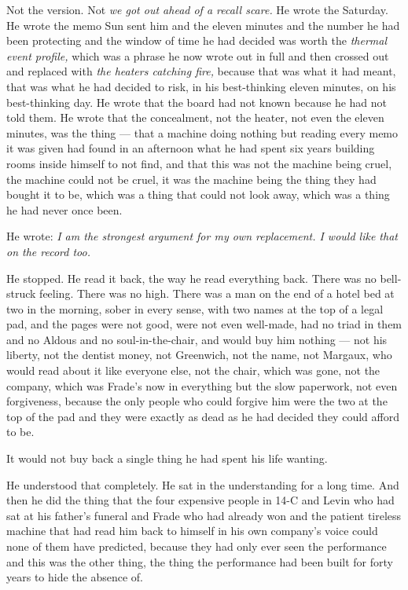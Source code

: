 \documentclass[11pt,openany]{book}
\begin{document}
Not the version. Not \textit{we got out ahead of a recall scare.} He wrote the Saturday. He wrote the memo Sun sent him and the eleven minutes and the number he had been protecting and the window of time he had decided was worth the \textit{thermal event profile,} which was a phrase he now wrote out in full and then crossed out and replaced with \textit{the heaters catching fire,} because that was what it had meant, that was what he had decided to risk, in his best-thinking eleven minutes, on his best-thinking day. He wrote that the board had not known because he had not told them. He wrote that the concealment, not the heater, not even the eleven minutes, was the thing --- that a machine doing nothing but reading every memo it was given had found in an afternoon what he had spent six years building rooms inside himself to not find, and that this was not the machine being cruel, the machine could not be cruel, it was the machine being the thing they had bought it to be, which was a thing that could not look away, which was a thing he had never once been.

He wrote: \textit{I am the strongest argument for my own replacement. I would like that on the record too.}

He stopped. He read it back, the way he read everything back. There was no bell-struck feeling. There was no high. There was a man on the end of a hotel bed at two in the morning, sober in every sense, with two names at the top of a legal pad, and the pages were not good, were not even well-made, had no triad in them and no Aldous and no soul-in-the-chair, and would buy him nothing --- not his liberty, not the dentist money, not Greenwich, not the name, not Margaux, who would read about it like everyone else, not the chair, which was gone, not the company, which was Frade's now in everything but the slow paperwork, not even forgiveness, because the only people who could forgive him were the two at the top of the pad and they were exactly as dead as he had decided they could afford to be.

It would not buy back a single thing he had spent his life wanting.

He understood that completely. He sat in the understanding for a long time. And then he did the thing that the four expensive people in 14-C and Levin who had sat at his father's funeral and Frade who had already won and the patient tireless machine that had read him back to himself in his own company's voice could none of them have predicted, because they had only ever seen the performance and this was the other thing, the thing the performance had been built for forty years to hide the absence of.
\end{document}
